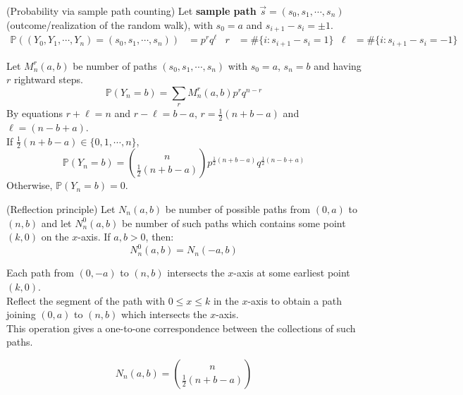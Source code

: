 \documentclass{huhtakm-template-book}
\newcommand{\prob}{\mathbb{P}}
\begin{document}
\begin{eg}(Probability via sample path counting)
	Let \textbf{sample path} $\vec{s}=(s_{0},s_{1},\cdots,s_{n})$ (outcome/realization of the random walk), with $s_{0}=a$ and $s_{i+1}-s_{i}=\pm 1$.
	\begin{align*}
		\prob((Y_{0},Y_{1},\cdots,Y_{n})=(s_{0},s_{1},\cdots,s_{n}))&=p^{r}q^{\ell} & r&=\#\{i:s_{i+1}-s_{i}=1\} & \ell&=\#\{i:s_{i+1}-s_{i}=-1\}
	\end{align*}
\end{eg}
\begin{eg}
	Let $M_{n}^{r}(a,b)$ be number of paths $(s_{0},s_{1},\cdots,s_{n})$ with $s_{0}=a$, $s_{n}=b$ and having $r$ rightward steps.
	\begin{equation*}
		\prob(Y_{n}=b)=\sum_{r} M_{n}^{r}(a,b)p^{r}q^{n-r}
	\end{equation*}
	By equations $r+\ell=n$ and $r-\ell=b-a$, $r=\frac{1}{2}(n+b-a)$ and $\ell=(n-b+a)$.\\
	If $\frac{1}{2}(n+b-a)\in\{0,1,\cdots,n\}$,
	\begin{equation*}
		\prob(Y_{n}=b)=\binom{n}{\frac{1}{2}(n+b-a)}p^{\frac{1}{2}(n+b-a)}q^{\frac{1}{2}(n-b+a)}
	\end{equation*}
	Otherwise, $\prob(Y_{n}=b)=0$.
\end{eg}
\begin{thm}(Reflection principle)
	Let $N_{n}(a,b)$ be number of possible paths from $(0,a)$ to $(n,b)$ and let $N_{n}^{0}(a,b)$ be number of such paths which contains some point $(k,0)$ on the $x$-axis. If $a,b>0$, then:
	\begin{equation*}
		N_{n}^{0}(a,b)=N_{n}(-a,b)
	\end{equation*}
\end{thm}
\begin{proofing}
	Each path from $(0,-a)$ to $(n,b)$ intersects the $x$-axis at some earliest point $(k,0)$.\\
	Reflect the segment of the path with $0\leq x\leq k$ in the $x$-axis to obtain a path joining $(0,a)$ to $(n,b)$ which intersects the $x$-axis.\\
	This operation gives a one-to-one correspondence between the collections of such paths.
\end{proofing}
\begin{lem}
	\label{Appendix A (Lemma) Number of paths calculation}
	\begin{equation*}
		N_{n}(a,b)=\binom{n}{\frac{1}{2}(n+b-a)}
	\end{equation*}
\end{lem}
\end{document}
